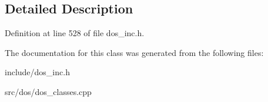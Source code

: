 \subsection{Detailed Description}


Definition at line 528 of file dos\-\_\-inc.\-h.



The documentation for this class was generated from the following files\-:\begin{DoxyCompactItemize}
\item 
include/dos\-\_\-inc.\-h\item 
src/dos/dos\-\_\-classes.\-cpp\end{DoxyCompactItemize}
